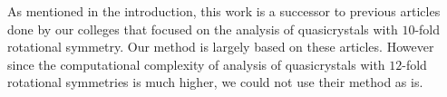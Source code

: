 \documentclass[text.tex]{subfiles}
\begin{document}

%


As mentioned in the introduction, this work is a successor to previous articles done by our colleges that focused on the analysis of quasicrystals with $10$-fold rotational symmetry. Our method is largely based on these articles. However since the computational complexity of analysis of quasicrystals with $12$-fold rotational symmetries is much higher, we could not use their method as is. 
\end{document}

